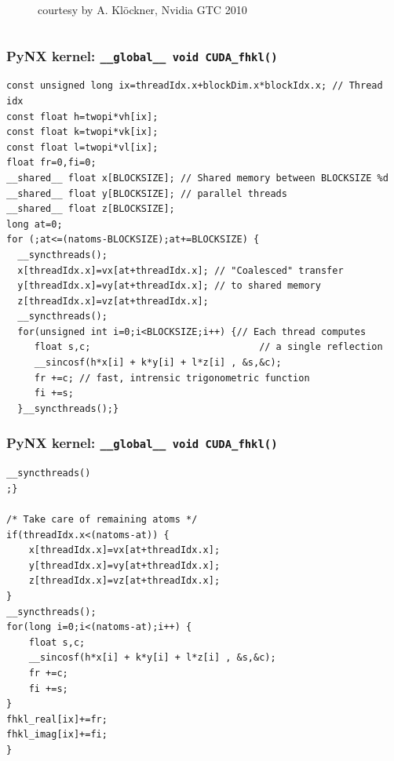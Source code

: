 \documentclass[]{beamer}
\begin{document}
\begin{frame}
\begin{columns}
\begin{column}{.45\textwidth}
\begin{figure}
\begin{minipage}{0.65\textwidth}
                \caption{courtesy by A. Kl\"{o}ckner, Nvidia GTC 2010}
            \end{minipage}
        \end{figure}   
    \end{column}
    \hspace*{-2cm}
\end{columns}
\end{frame}




\begin{frame}[fragile]
\frametitle{PyNX \textbf{kernel}: \texttt{\_\_global\_\_ void CUDA\_fhkl()}}
\begin{lstlisting}
const unsigned long ix=threadIdx.x+blockDim.x*blockIdx.x; // Thread idx
const float h=twopi*vh[ix];
const float k=twopi*vk[ix];
const float l=twopi*vl[ix];
float fr=0,fi=0;
__shared__ float x[BLOCKSIZE]; // Shared memory between BLOCKSIZE %d  
__shared__ float y[BLOCKSIZE]; // parallel threads
__shared__ float z[BLOCKSIZE];
long at=0;
for (;at<=(natoms-BLOCKSIZE);at+=BLOCKSIZE) { 
  __syncthreads();
  x[threadIdx.x]=vx[at+threadIdx.x]; // "Coalesced" transfer 
  y[threadIdx.x]=vy[at+threadIdx.x]; // to shared memory
  z[threadIdx.x]=vz[at+threadIdx.x];
  __syncthreads();
  for(unsigned int i=0;i<BLOCKSIZE;i++) {// Each thread computes
     float s,c;                              // a single reflection
     __sincosf(h*x[i] + k*y[i] + l*z[i] , &s,&c);  
     fr +=c; // fast, intrensic trigonometric function
     fi +=s;
  }__syncthreads();} 	
\end{lstlisting}
\end{frame}


\begin{frame}[fragile]
\frametitle{PyNX \textbf{kernel}: \texttt{\_\_global\_\_ void CUDA\_fhkl()}}
\begin{lstlisting}
__syncthreads()
;}

/* Take care of remaining atoms */
if(threadIdx.x<(natoms-at)) {
    x[threadIdx.x]=vx[at+threadIdx.x]; 
    y[threadIdx.x]=vy[at+threadIdx.x];
    z[threadIdx.x]=vz[at+threadIdx.x];
}
__syncthreads();
for(long i=0;i<(natoms-at);i++) {
    float s,c;
    __sincosf(h*x[i] + k*y[i] + l*z[i] , &s,&c);
    fr +=c;
    fi +=s;
}
fhkl_real[ix]+=fr;
fhkl_imag[ix]+=fi;
}
\end{lstlisting}
\end{frame}
\end{document}
